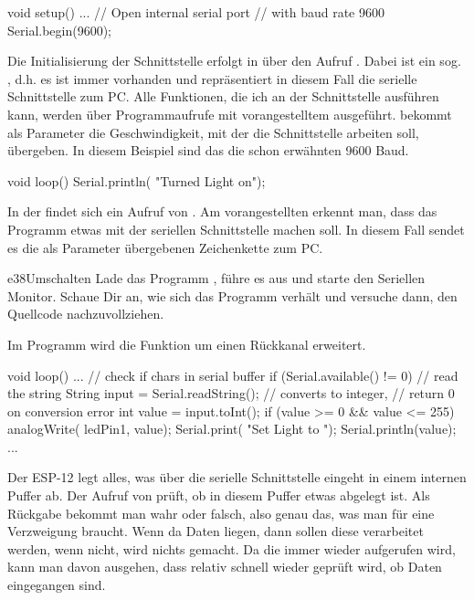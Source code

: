 \vfill\null\columnbreak
\begin{src}
void setup() {
  ...
  // Open internal serial port 
  // with baud rate 9600
  Serial.begin(9600);
}
\end{src}

Die Initialisierung der Schnittstelle erfolgt in  über den Aufruf .
Dabei ist  ein sog. , d.h. es ist immer vorhanden und repräsentiert
in diesem Fall die serielle Schnittstelle zum PC. Alle Funktionen, die ich an
der Schnittstelle ausführen kann, werden über Programmaufrufe mit vorangestelltem  ausgeführt.
 bekommt als Parameter die Geschwindigkeit, mit der die Schnittstelle arbeiten soll, übergeben.
In diesem Beispiel sind das die schon erwähnten 9600 Baud.


\vfill\null\pagebreak
\begin{src}
void loop() {
  Serial.println(
    "Turned Light on");}
\end{src}

In der  findet sich ein Aufruf von . Am vorangestellten  erkennt man,
dass das Programm etwas mit der seriellen Schnittstelle machen soll. In diesem Fall sendet es die als 
Parameter übergebenen Zeichenkette zum PC.

\begin{excercise}{e38}{Umschalten}
Lade das Programm , führe es aus und starte den Seriellen Monitor.
Schaue Dir an, wie sich das Programm verhält und versuche dann, den Quellcode nachzuvollziehen.
\end{excercise}

Im Programm  wird die Funktion um einen Rückkanal erweitert.

\begin{src}
void loop() {
  ...
  // check if chars in serial buffer
  if (Serial.available() != 0) 
  {
    // read the string
    String input = 
      Serial.readString();
    // converts to integer, 
    // return 0 on conversion error
    int value = input.toInt();
    if (value >= 0 && 
      value <= 255)
    {
      analogWrite(
        ledPin1, value);
      Serial.print(
        "Set Light to ");
      Serial.println(value);
    }
  }
  ...
}
\end{src}

Der ESP-12 legt alles, was über die serielle Schnittstelle eingeht in einem internen Puffer ab.
Der Aufruf von  prüft, ob in diesem Puffer etwas abgelegt ist.
Als Rückgabe bekommt man wahr oder falsch, also genau das, was man für eine Verzweigung braucht.
Wenn da Daten liegen, dann sollen diese verarbeitet werden, wenn nicht, wird nichts gemacht. 
Da die  immer wieder aufgerufen wird, kann man davon ausgehen, dass relativ schnell
wieder geprüft wird, ob Daten eingegangen sind.

